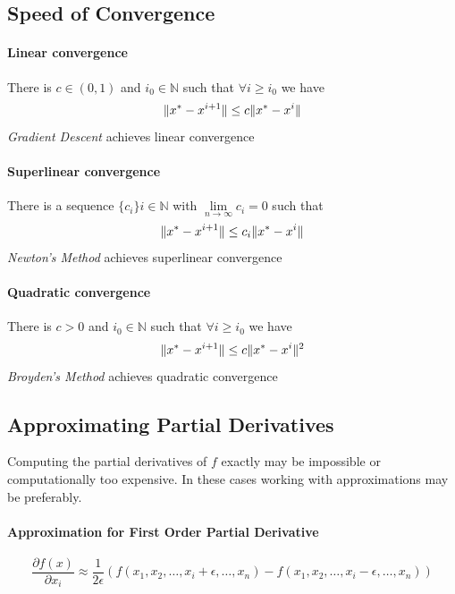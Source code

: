 \documentclass[11pt]{article}
\DeclarePairedDelimiter\norm{\lVert}{\rVert}
\begin{document}
\subsection{Speed of Convergence}

\paragraph{Linear convergence} There is $c\in(0,1)$ and $i_0 \in \mathbb{N}$ such that $\forall i\geq i_0$ we have
\begin{equation*}
	\norm{x^* - x^{i+1}} \leq c \norm{x^* - x^{i}}
\end{equation*}
\emph{Gradient Descent} achieves linear convergence

\paragraph{Superlinear convergence} There is a sequence $\{c_i\} i\in\mathbb{N}$ with $\lim\limits_{n\rightarrow\infty}c_i = 0$ such that
\begin{equation*}
\norm{x^* - x^{i+1}} \leq c_i \norm{x^* - x^{i}}
\end{equation*}
\emph{Newton's Method} achieves superlinear convergence

\paragraph{Quadratic convergence} There is $c > 0$ and $i_0 \in \mathbb{N}$ such that $\forall i \geq i_0$ we have
\begin{equation*}
\norm{x^* - x^{i+1}} \leq c \norm{x^* - x^{i}}^2
\end{equation*}
\emph{Broyden's Method} achieves quadratic convergence

\subsection{Approximating Partial Derivatives}
Computing the partial derivatives of $f$ exactly may be impossible or computationally too expensive. In these cases working with approximations may be preferably.

\paragraph{Approximation for First Order Partial Derivative}
\begin{equation*}
	\frac{\partial f(x)}{\partial x_i} \approx \frac{1}{2\epsilon}\left(f(x_1,x_2, \dots, x_i + \epsilon, \dots, x_n) - f(x_1,x_2, \dots, x_i - \epsilon, \dots, x_n)\right)
\end{equation*}
\end{document}
